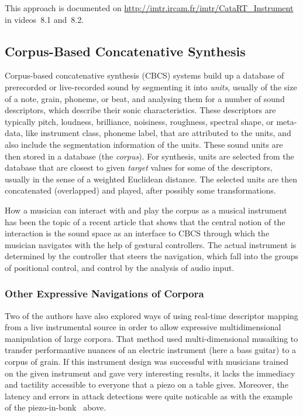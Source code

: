 This approach is documented on \url{http://imtr.ircam.fr/imtr/CataRT_Instrument} in videos~8.1 and~8.2.


\subsection{Corpus-Based Concatenative Synthesis}

Corpus-based concatenative synthesis (CBCS) \cite{Schwarz-ieeespm2007-concat} systems build up a database of prerecorded or live-recorded sound by segmenting it into
\textit{units}, usually of the size of a note, grain, phoneme, or beat, and analysing them for a
number of sound descriptors, which describe their sonic characteristics.
These descriptors are typically pitch, loudness, brilliance, noisiness, roughness, spectral shape, or meta-data, like instrument class, phoneme label, that are attributed to the units,
and also include the segmentation information of the units.
These sound units are then stored in a database (the \textit{corpus}).  For synthesis, units are
selected from the database that are closest to given \textit{target} values for some of the
descriptors, usually in the sense of a weighted Euclidean distance.
The selected units are then concatenated (overlapped) and played, after possibly some transformations.

How a musician can interact with and play the corpus as a musical instrument has been the topic of a recent article \cite{Schwarz-nime2012-sound-space} that shows that the central notion of the interaction is the sound space as an interface to CBCS through which the musician navigates with the help of gestural controllers.  
The actual instrument is determined by the controller that steers the
navigation, which fall into the groups of positional control, and control by the analysis of audio
input.

\subsubsection{Other Expressive Navigations of Corpora}

Two of the authors have also explored ways of using real-time descriptor mapping from a live instrumental source in order to allow expressive multidimensional manipulation of large corpora. That method used multi-dimensional musaiking to transfer performantive nuances of an electric instrument (here a bass guitar) to a corpus of grain. If this instrument design was successful with musicians trained on the given instrument and gave very interesting results, it lacks the immediacy and tactility accessible to everyone that a piezo on a table gives. Moreover, the latency and errors in attack detections were quite noticable as with the example of the piezo-in-bonk~ above.

